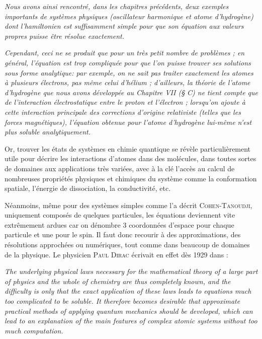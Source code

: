 \documentclass[svgnames,dvipsnames,a4paper,10pt,french]{report}
\begin{document}
\begin{displayquote}
\textit{Nous avons ainsi rencontré, dans les chapitres précédents, deux exemples importants de systèmes physiques (oscillateur harmonique et atome d’hydrogène) dont l’hamiltonien est suffisamment simple pour que son équation aux valeurs propres puisse être résolue exactement.}


\textit{Cependant, ceci ne se produit que pour un très petit nombre de problèmes ; en général, l’équation est trop compliquée pour que l’on puisse trouver ses solutions sous forme analytique: par exemple, on ne sait pas traiter exactement les atomes à plusieurs électrons, pas même celui d’hélium ; d’ailleurs, la théorie de l’atome d’hydrogène que nous avons développée au Chapitre VII (§ C) ne tient compte que de l’interaction électrostatique entre le proton et l’électron ; lorsqu’on ajoute à cette interaction principale des corrections d’origine relativiste (telles que les forces magnétiques), l’équation obtenue pour l’atome d’hydrogène lui-même n’est plus soluble analytiquement.}
\end{displayquote}


Or, trouver les états de systèmes en chimie quantique se révèle particulièrement utile pour décrire les interactions d'atomes dans des molécules, dans toutes sortes de domaines aux applications très variées, avec à la clé l'accès au calcul de nombreuses propriétés physiques et chimiques du système comme la conformation spatiale, l'énergie de dissociation, la conductivité, etc.  \cite{dusson_error_2017}

Néanmoins, même pour des systèmes simples comme l'a décrit \textsc{Cohen-Tanoudji}, uniquement composés de quelques particules, les équations deviennent vite extrêmement ardues car on dénombre 3 coordonnées d'espace pour chaque particule et une pour le spin.
Il faut donc recourir à des approximations, des résolutions approchées ou numériques, tout comme dans beaucoup de domaines de la physique. Le physicien \textsc{Paul Dirac} écrivait en effet dès 1929 dans \cite{dirac_quantum_1929}:

\begin{displayquote}
\textit{The underlying physical laws necessary for the mathematical theory of a large part of physics and the whole of chemistry are thus completely known, and the difficulty is only that the exact application of these laws leads to equations much too complicated to be soluble. It therefore becomes desirable that approximate practical methods of applying quantum mechanics should be developed, which can lead to an explanation of the main features of complex atomic systems without too much computation.}
\end{displayquote}
\end{document}
